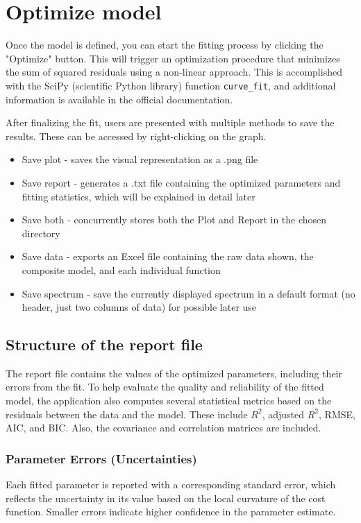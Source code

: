 \section{Optimize model}
Once the model is defined, you can start the fitting process by clicking the "Optimize" button. This will trigger an optimization procedure that minimizes the sum of squared residuals using a non-linear approach. This is accomplished with the SciPy (scientific Python library) function \texttt{curve\_fit}, and additional information is available in the official documentation.
\par
After finalizing the fit, users are presented with multiple methods to save the results. These can be accessed by right-clicking on the graph.
\begin{itemize}
    \item Save plot - saves the visual representation as a .png file
    \item Save report - generates a .txt file containing the optimized parameters and fitting statistics, which will be explained in detail later
    \item Save both - concurrently stores both the Plot and Report in the chosen directory
    \item Save data - exports an Excel file containing the raw data shown, the composite model, and each individual function
    \item Save spectrum - save the currently displayed spectrum in a default format (no header, just two columns of data) for possible later use
\end{itemize}

\subsection{Structure of the report file}
The report file contains the values of the optimized parameters, including their errors from the fit.
To help evaluate the quality and reliability of the fitted model, the application also computes several statistical metrics based on the residuals between the data and the model. These include $R^2$, adjusted $R^2$, RMSE, AIC, and BIC. Also, the covariance and correlation matrices are included.
\par
\subsubsection*{Parameter Errors (Uncertainties)}

Each fitted parameter is reported with a corresponding standard error, which reflects the uncertainty in its value based on the local curvature of the cost function. Smaller errors indicate higher confidence in the parameter estimate.

